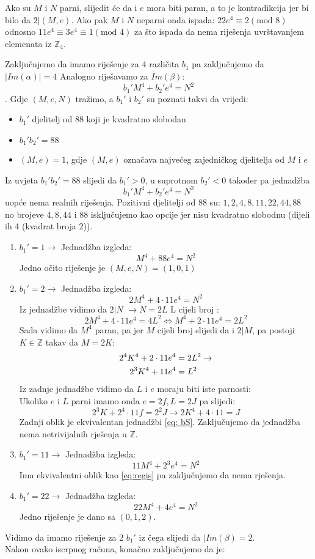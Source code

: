 \documentclass[12pt, a4paper]{article}
\begin{document}
\begin{spacing}{1.5}
\begin{enumerate}
Ako su $M$ i $N$ parni, slijedit će da i $e$ mora biti paran, a to je kontradikcija jer bi bilo da $2|(M,e)$.
Ako pak $M$ i $N$ neparni onda ispada: $22e^4\equiv 2  (\textrm{mod  } 8)$ odnosno $11e^4\equiv 3 e^4\equiv 1  (\textrm{mod } 4)$
za što ispada da nema riješenja uvrštavanjem elemenata iz $\mathbb{Z}_4$.\\
\end{enumerate} 
Zaključujemo da imamo riješenje za 4 različita $b_1$ pa zaključujemo da $|Im(\alpha)|=4$
Analogno riješavamo za $Im(\beta)$:\\
\[b_1'M	^4+b_2'e^4=N^2\].
Gdje $(M,e,N)$ tražimo, a $b_1'$ i $b_2'$ su poznati takvi da vrijedi:
\begin{itemize}
\item $b_1'$ djelitelj od $88$ koji je kvadratno slobodan
\item $b_1' b_2'=88$
\item $(M,e)=1$, gdje $(M,e)$ označava najvećeg zajedničkog djelitelja od $M$ i $e$
\end{itemize}
Iz uvjeta $b_1' b_2'=88$ slijedi da $b_1' > 0$, u suprotnom $b_2'<0$ također pa jednadžba \[b_1'M^4+b_2'e^4=N^2\] uopće nema realnih riješenja. Pozitivni djelitelji od $88$ su: $1,2,4,8,11,22,44,88$ no brojeve $4,8,44$ i $88$ isključujemo kao opcije jer nisu kvadratno slobodnu (dijeli ih 4 (kvadrat broja 2)).
\begin{enumerate}
\item $b_1'=1 \to $ Jednadžba izgleda:
\[M^4+88e^4=N^2\]
Jedno očito riješenje je $(M,e,N)=(1,0,1)$
\item $b_1'=2 \to $ Jednadžba izgleda:
\begin{equation}
\label{eq: bS}
2M^4+4 \cdot 11 e^4=N^2
\end{equation}
Iz jednadžbe vidimo da $2|N$ $\to N=2L \textrm{ L cijeli broj }$:
\[2M^4+4 \cdot 11 e^4=4L^2 \Leftrightarrow M^4 +2 \cdot 11 e^4 =2L^2\]
Sada vidimo da $M^4$ paran, pa jer $M$ cijeli broj slijedi da i $2|M$, pa postoji $K \in \mathbb{Z}$ takav da $M=2K$:
\begin{align}
\label{eq:regis}
2^4 K^4+2 \cdot 11 e^4 &=2 L^2 \to \notag \\
2^3 K^4+11 e^4 &= L^2
\end{align}
Iz zadnje jednadžbe vidimo da $L$ i  $e$ moraju biti iste parnosti:\\
Ukoliko  $e$ i $L$ parni imamo onda $e=2f, L=2J$ pa slijedi:
\[2^3 K+ 2^4 \cdot 11 f =2^2 J \to 2K^4+4\cdot 11=J\]
Zadnji oblik je ekvivalentan jednadžbi \eqref{eq: bS}. Zaključujemo da jednadžba nema netrivijalnih rješenja u $\mathbb{Z}$.
\item $b_1'= 11 \to$ Jednadžba izgleda:
\[11 M^4 + 2^3 e^4=N^2\]
Ima ekvivalentni oblik kao \eqref{eq:regis} pa zaključujemo da nema rješenja.
\item $b_1'=22 \to$ Jednadžba izgleda:
\[22 M^4+ 4e^4=N^2\]
Jedno riješenje je dano sa $(0,1,2)$.
\end{enumerate}
Vidimo da imamo riješenje za $2$ $b_1'$ iz čega slijedi da $|Im(\beta)=2$.\\
Nakon ovako iscrpnog računa, konačno zaključujemo da je:


\end{spacing}
\end{document}
